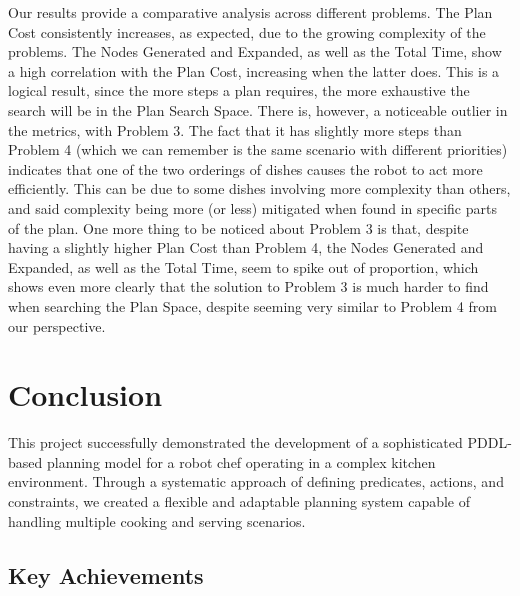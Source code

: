 \documentclass{article}
\begin{document}
Our results provide a comparative analysis across different problems. The Plan Cost consistently increases, as expected, due to the growing complexity of the problems. The Nodes Generated and Expanded, as well as the Total Time, show a high correlation with the Plan Cost, increasing when the latter does. This is a logical result, since the more steps a plan requires, the more exhaustive the search will be in the Plan Search Space. There is, however, a noticeable outlier in the metrics, with Problem 3. The fact that it has slightly more steps than Problem 4 (which we can remember is the same scenario with different priorities) indicates that one of the two orderings of dishes causes the robot to act more efficiently. This can be due to some dishes involving more complexity than others, and said complexity being more (or less) mitigated when found in specific parts of the plan. One more thing to be noticed about Problem 3 is that, despite having a slightly higher Plan Cost than Problem 4, the Nodes Generated and Expanded, as well as the Total Time, seem to spike out of proportion, which shows even more clearly that the solution to Problem 3 is much harder to find when searching the Plan Space, despite seeming very similar to Problem 4 from our perspective. 

\newpage
\section{Conclusion}

This project successfully demonstrated the development of a sophisticated PDDL-based planning model for a robot chef operating in a complex kitchen environment. Through a systematic approach of defining predicates, actions, and constraints, we created a flexible and adaptable planning system capable of handling multiple cooking and serving scenarios.

\subsection{Key Achievements}
\end{document}
